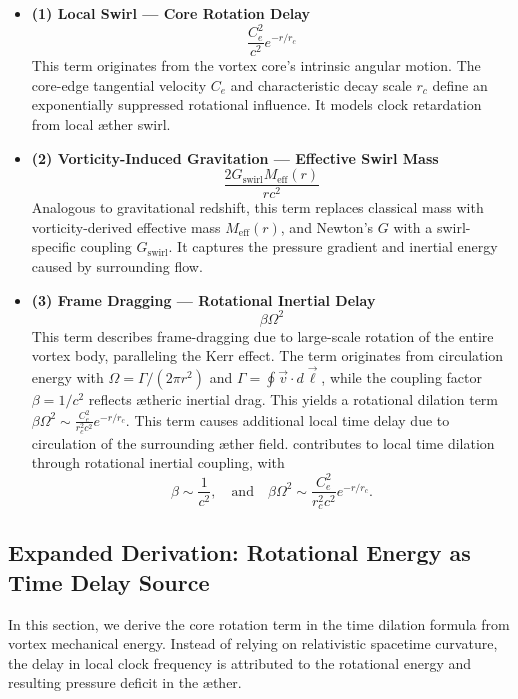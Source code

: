 \begin{itemize}
    \item \textbf{(1) Local Swirl — Core Rotation Delay}
    \[
        \frac{C_e^2}{c^2} e^{-r/r_c}
    \]
    This term originates from the vortex core's intrinsic angular motion. The core-edge tangential velocity \( C_e \) and characteristic decay scale \( r_c \) define an exponentially suppressed rotational influence. It models clock retardation from local æther swirl.

    \item \textbf{(2) Vorticity-Induced Gravitation — Effective Swirl Mass}
    \[
        \frac{2 G_\text{swirl} M_\text{eff}(r)}{r c^2}
    \]
    Analogous to gravitational redshift, this term replaces classical mass with vorticity-derived effective mass \( M_\text{eff}(r) \), and Newton's \( G \) with a swirl-specific coupling \( G_\text{swirl} \). It captures the pressure gradient and inertial energy caused by surrounding flow.

    \item \textbf{(3) Frame Dragging — Rotational Inertial Delay}
    \[
        \beta \Omega^2
    \]
    This term describes frame-dragging due to large-scale rotation of the entire vortex body, paralleling the Kerr effect.  The term originates from circulation energy with $\Omega = \Gamma / (2\pi r^2)$ and $\Gamma = \oint \vec{v} \cdot d\vec{\ell}$, while the coupling factor $\beta = 1/c^2$ reflects ætheric inertial drag. This yields a rotational dilation term $\beta \Omega^2 \sim \frac{C_e^2}{r_c^2 c^2} e^{-r/r_c}$. This term causes additional local time delay due to circulation of the surrounding æther field. contributes to local time dilation through rotational inertial coupling, with
    \[
        \beta \sim \frac{1}{c^2}, \quad \text{and} \quad \beta \Omega^2 \sim \frac{C_e^2}{r_c^2 c^2} e^{-r/r_c}.
    \]
\end{itemize}


\subsection{Expanded Derivation: Rotational Energy as Time Delay Source}\label{sec:appendix:1:rot-energy}

In this section, we derive the core rotation term in the time dilation formula from vortex mechanical energy. Instead of relying on relativistic spacetime curvature, the delay in local clock frequency is attributed to the rotational energy and resulting pressure deficit in the æther.

